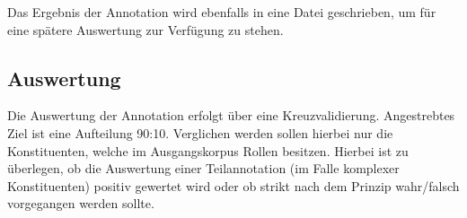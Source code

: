 \documentclass[12pt]{article}
\begin{document}
Das Ergebnis der Annotation wird ebenfalls in eine Datei geschrieben, um für
eine spätere Auswertung zur Verfügung zu stehen.

\subsection{Auswertung}

Die Auswertung der Annotation erfolgt über eine Kreuzvalidierung. Angestrebtes
Ziel ist eine Aufteilung 90:10. Verglichen werden sollen hierbei nur die
Konstituenten, welche im Ausgangskorpus Rollen besitzen. Hierbei ist zu
überlegen, ob die Auswertung einer Teilannotation (im Falle komplexer Konstituenten)
positiv gewertet wird oder ob strikt nach dem Prinzip \glqq{}wahr/falsch\grqq{}
vorgegangen werden sollte.




\end{document}
